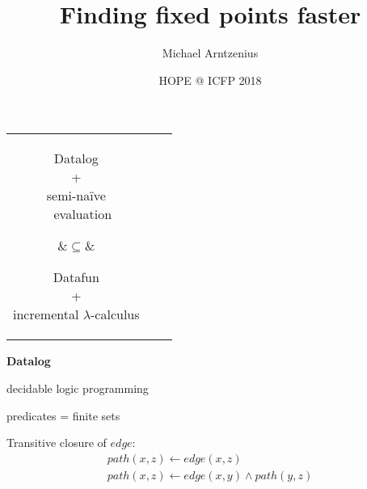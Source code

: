 \documentclass[dvipsnames]{beamer}
\title{Finding fixed points faster}
\author{Michael Arntzenius}
\institute{University of Birmingham}
\date{HOPE @ ICFP 2018}
\newcommand\rel[1]{\ensuremath{\mathit{#1}}}
\begin{document}
\maketitle

\begin{frame}
  \huge
  \begin{center}
    \begin{tabular}{ccc}
      \parbox{4cm}{
        \begin{center}
           Datalog\\ +\\
           semi-na\"ive\\\ \ evaluation
        \end{center}}
      &{\Huge $\subseteq$}&
      \parbox{4cm}{
        \begin{center}
           Datafun\\ +\\
           incremental $\lambda$-calculus
        \end{center}
      }
    \end{tabular}
  \end{center}
\end{frame}





\begin{frame}
  \Huge \centering \textbf{Datalog}\vspace{0.66cm}

  \huge decidable logic programming\vspace{0.66cm}

  predicates = finite sets
\end{frame}

\begin{frame}
  \LARGE
  Transitive closure of \rel{edge}:
  \[
  \begin{array}{l}
    \rel{path}(x,z) \leftarrow \rel{edge}(x,z)\\
    \rel{path}(x,z) \leftarrow \rel{edge}(x,y) \wedge \rel{path}(y,z)
  \end{array}
  \]
\end{frame}
\end{document}
